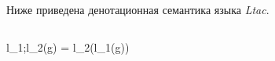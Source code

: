 \documentclass[12pt]{article}
\begin{document}





Ниже приведена денотационная семантика языка \textit{Ltac}. 



$$

\llbracket l_1;l_2\rrbracket (g) = \llbracket l_2\rrbracket (\llbracket l_1\rrbracket (g)) 
\\
\end{document}
